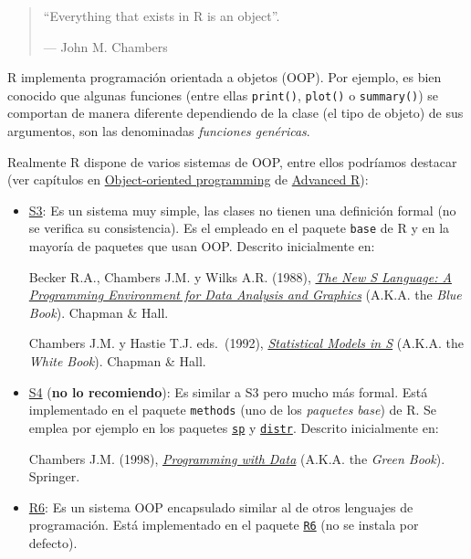 \documentclass[
]{book}
\theoremstyle{break}
\theoremstyle{nonumberplain}
\begin{document}
\begin{quote}
``Everything that exists in R is an object''.

--- John M. Chambers
\end{quote}

R implementa programación orientada a objetos (OOP).
Por ejemplo, es bien conocido que algunas funciones (entre ellas \texttt{print()}, \texttt{plot()} o \texttt{summary()}) se comportan de manera diferente dependiendo de la clase (el tipo de objeto) de sus argumentos, son las denominadas \emph{funciones genéricas}.

Realmente R dispone de varios sistemas de OOP, entre ellos podríamos destacar (ver capítulos en \href{https://adv-r.hadley.nz/oo.html}{Object-oriented programming} de \href{https://adv-r.hadley.nz}{Advanced R}):

\begin{itemize}
\item
  \href{https://adv-r.hadley.nz/s3.html}{S3}: Es un sistema muy simple, las clases no tienen una definición formal (no se verifica su consistencia). Es el empleado en el paquete \texttt{base} de R y en la mayoría de paquetes que usan OOP.
  Descrito inicialmente en:

  Becker R.A., Chambers J.M. y Wilks A.R. (1988), \emph{\href{https://www.amazon.es/dp/053409192X}{The New S Language: A Programming Environment for Data Analysis and Graphics}} (A.K.A. the \emph{Blue Book}). Chapman \& Hall.

  Chambers J.M. y Hastie T.J. eds.~(1992), \emph{\href{https://www.amazon.com/gp/product/0534167659}{Statistical Models in S}} (A.K.A. the \emph{White Book}). Chapman \& Hall.
\item
  \href{https://adv-r.hadley.nz/s4.html}{S4} (\textbf{no lo recomiendo}): Es similar a S3 pero mucho más formal. Está implementado en el paquete \texttt{methods} (uno de los \emph{paquetes base}) de R. Se emplea por ejemplo en los paquetes \href{https://github.com/edzer/sp/}{\texttt{sp}} y \href{http://distr.r-forge.r-project.org/}{\texttt{distr}}.
  Descrito inicialmente en:

  Chambers J.M. (1998), \emph{\href{https://www.amazon.com/gp/product/0387985034}{Programming with Data}} (A.K.A. the \emph{Green Book}). Springer.
\item
  \href{https://adv-r.hadley.nz/r6.html}{R6}: Es un sistema OOP encapsulado similar al de otros lenguajes de programación. Está implementado en el paquete \href{https://r6.r-lib.org}{\texttt{R6}} (no se instala por defecto).
\end{itemize}
\end{document}
